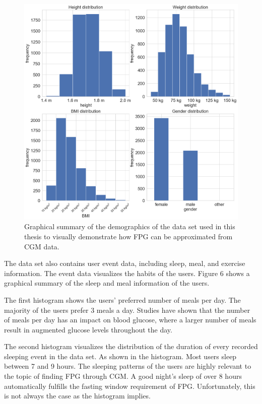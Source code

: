\documentclass[english, 12pt, a4paper, elec, utf8, a-1b, online]{aaltothesis}
\begin{document}
\begin{figure}[H]
\centering
\includegraphics[width=14cm]{demographics.png}
\caption{Graphical summary of the demographics of the data set used in this thesis to visually demonstrate how FPG can be approximated from CGM data.}
\end{figure}

The data set also contains user event data, including sleep, meal, 
and exercise information. The event data visualizes the habits of the users.   
Figure 6 shows a graphical summary of the sleep and meal information of the users. 

The first histogram shows the users' preferred number of meals per day. The majority of the users prefer 3 meals a day.
Studies have shown that the number of meals per day has an impact on blood glucose, where a larger number of meals 
result in augmented glucose levels throughout the day\cite{HOLMSTRUP2010e277}.

The second histogram visualizes the distribution of the duration of every recorded sleeping event in the data set.
As shown in the histogram. Most users sleep between 7 and 9 hours. The sleeping patterns of the users
are highly relevant to the topic of finding FPG through CGM. A good night's sleep of over 8 hours automatically fulfills the 
fasting window requirement of FPG. Unfortunately, this is not always the case as the histogram 
implies.
\end{document}
